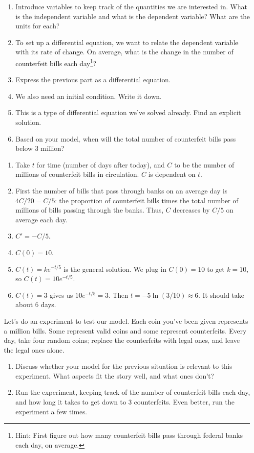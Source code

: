 \documentclass[12pt]{amsart}
\numberwithin{equation}{section}
\theoremstyle{plain} %
\theoremstyle{definition}
\theoremstyle{remark}
\begin{document}
\begin{enumerate}
\item Introduce variables to keep track of the quantities we are interested in. What is the independent variable and what is the dependent variable? What are the units for each?
\item To set up a differential equation, we want to relate the dependent variable with its rate of change. On average, what is the change in the number of counterfeit bills each day\footnote{Hint: First figure out how many counterfeit bills pass through federal banks each day, on average.}?
\item Express the previous part as a differential equation.
\item We also need an initial condition. Write it down.
\item This is a type of differential equation we've solved already. Find an explicit solution.
\item Based on your model, when will the total number of counterfeit bills pass below 3 million?
\end{enumerate}
\begin{framed}
\begin{enumerate}
\item Take $t$ for time (number of days after today), and $C$ to be the number of millions of counterfeit bills in circulation. $C$ is dependent on $t$.
\item First the number of bills that pass through banks on an average day is $4C/20 = C/5$: the proportion of counterfeit bills times the total number of millions of bills passing through the banks. Thus, $C$ decreases by $C/5$ on average each day.
\item $C'=-C/5$.
\item $C(0)=10$.
\item $C(t)=ke^{-t/5}$ is the general solution. We plug in $C(0)=10$ to get $k=10$, so $C(t)=10 e^{-t/5}$.
\item $C(t)=3$ gives us $10e^{-t/5}=3$. Then $t=-5 \ln(3/10) \approx 6$. It should take about $6$ days.
\end{enumerate}
\end{framed}

Let's do an experiment to test our model. Each coin you've been given represents a million bills. Some represent valid coins and some represent counterfeits. Every day, take four random coins; replace the counterfeits with legal ones, and leave the legal ones alone.

\begin{enumerate}
\item Discuss whether your model for the previous situation is relevant to this experiment. What aspects fit the story well, and what ones don't?
\item Run the experiment, keeping track of the number of counterfeit bills each day, and how long it takes to get down to 3 counterfeits. Even better, run the experiment a few times.
\end{enumerate}
\end{document}
